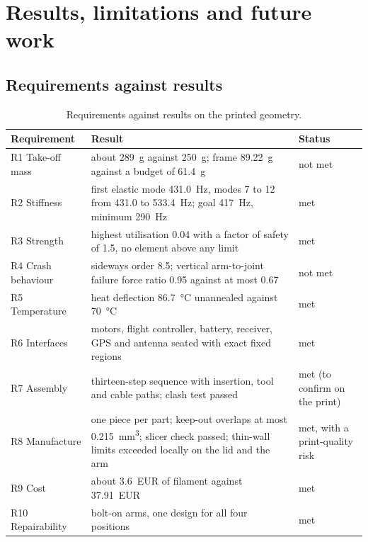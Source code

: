 \chapter{Results, limitations and future work}\label{sec:results}

\section{Requirements against results}\label{sec:res-table}

\begin{table}[htbp]
\centering\small
\caption{Requirements against results on the printed geometry.}\label{tab:res-table}
\begin{tabularx}{\linewidth}{@{}lXl@{}}
\toprule
Requirement & Result & Status\\
\midrule
R1 Take-off mass & about \SI{289}{g} against \SI{250}{g}; frame \SI{89.22}{g} against a budget of \SI{61.4}{g} & not met\\
R2 Stiffness & first elastic mode \SI{431.0}{Hz}, modes 7 to 12 from 431.0 to \SI{533.4}{Hz}; goal \SI{417}{Hz}, minimum \SI{290}{Hz} & met\\
R3 Strength & highest utilisation 0.04 with a factor of safety of 1.5, no element above any limit & met\\
R4 Crash behaviour & sideways order 8.5; vertical arm-to-joint failure force ratio 0.95 against at most 0.67 & not met\\
R5 Temperature & heat deflection \SI{86.7}{\celsius} unannealed against \SI{70}{\celsius} & met\\
R6 Interfaces & motors, flight controller, battery, receiver, GPS and antenna seated with exact fixed regions & met\\
R7 Assembly & thirteen-step sequence with insertion, tool and cable paths; clash test passed & met (to confirm on the print)\\
R8 Manufacture & one piece per part; keep-out overlaps at most \SI{0.215}{mm^3}; slicer check passed; thin-wall limits exceeded locally on the lid and the arm & met, with a print-quality risk\\
R9 Cost & about \SI{3.6}{EUR} of filament against \SI{37.91}{EUR} & met\\
R10 Repairability & bolt-on arms, one design for all four positions & met\\
\bottomrule
\end{tabularx}
\end{table}


